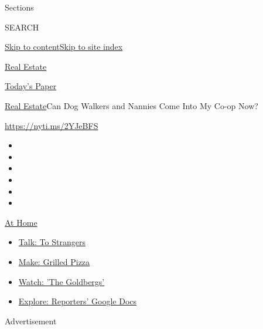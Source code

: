 Sections

SEARCH

\protect\hyperlink{site-content}{Skip to
content}\protect\hyperlink{site-index}{Skip to site index}

\href{https://www.nytimes.com/section/realestate}{Real Estate}

\href{https://myaccount.nytimes.com/auth/login?response_type=cookie\&client_id=vi}{}

\href{https://www.nytimes.com/section/todayspaper}{Today's Paper}

\href{/section/realestate}{Real Estate}\textbar{}Can Dog Walkers and
Nannies Come Into My Co-op Now?

\url{https://nyti.ms/2YJeBFS}

\begin{itemize}
\item
\item
\item
\item
\item
\item
\end{itemize}

\href{https://www.nytimes.com/spotlight/at-home?action=click\&pgtype=Article\&state=default\&region=TOP_BANNER\&context=at_home_menu}{At
Home}

\begin{itemize}
\tightlist
\item
  \href{https://www.nytimes.com/2020/08/03/well/family/the-benefits-of-talking-to-strangers.html?action=click\&pgtype=Article\&state=default\&region=TOP_BANNER\&context=at_home_menu}{Talk:
  To Strangers}
\item
  \href{https://www.nytimes.com/2020/08/01/at-home/coronavirus-make-pizza-on-a-grill.html?action=click\&pgtype=Article\&state=default\&region=TOP_BANNER\&context=at_home_menu}{Make:
  Grilled Pizza}
\item
  \href{https://www.nytimes.com/2020/07/31/arts/television/goldbergs-abc-stream.html?action=click\&pgtype=Article\&state=default\&region=TOP_BANNER\&context=at_home_menu}{Watch:
  'The Goldbergs'}
\item
  \href{https://www.nytimes.com/interactive/2020/at-home/even-more-reporters-editors-diaries-lists-recommendations.html?action=click\&pgtype=Article\&state=default\&region=TOP_BANNER\&context=at_home_menu}{Explore:
  Reporters' Google Docs}
\end{itemize}

Advertisement

